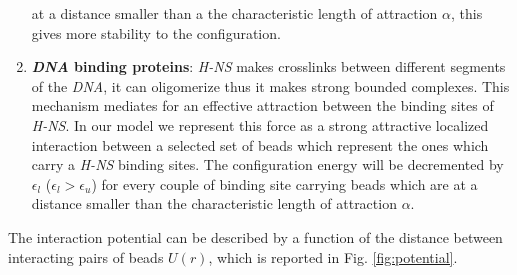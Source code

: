 \documentclass[12pt,a4paper,notitlepage]{article}
\newcommand{\hns}{\emph{H-NS}\xspace}
\newcommand{\dna}{\emph{DNA}\xspace}
\begin{document}
\begin{enumerate}
  at a distance smaller than a the characteristic length of attraction
  $\alpha$, this gives more stability to the configuration.
\item
  {\bf \dna binding proteins}: \hns makes crosslinks between
  different segments of the \dna, it can oligomerize thus it makes
  strong bounded complexes. This mechanism mediates for an effective
  attraction between the binding sites of \hns. In our model we
  represent this force as a strong attractive localized interaction
  between a selected set of beads which represent the ones which carry
  a \hns binding sites. The configuration energy will be decremented
  by $\epsilon_l$ ($\epsilon_l > \epsilon_u$) for every couple of
  binding site carrying beads which are at a distance smaller than
  the characteristic length  of attraction $\alpha$.
\end{enumerate}

The interaction potential can be described by a function of  
the distance between interacting pairs of beads $U(r)$, which is
reported in Fig. \ref{fig:potential}.
\end{document}
